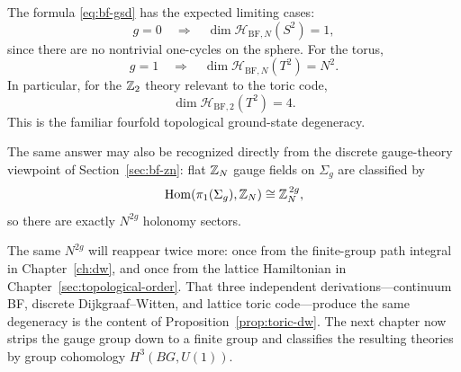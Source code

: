 \begin{remark}\label{rem:bf-gsd-checks}
The formula \eqref{eq:bf-gsd} has the expected limiting cases:
\begin{equation*}
g=0
\quad\Longrightarrow\quad
\dim \mathcal{H}_{\mathrm{BF},N}(S^2)=1,
\end{equation*}
since there are no nontrivial one-cycles on the sphere. For the torus,
\begin{equation*}
g=1
\quad\Longrightarrow\quad
\dim \mathcal{H}_{\mathrm{BF},N}(T^2)=N^2.
\end{equation*}
In particular, for the $\mathbb{Z}_2$ theory relevant to the toric code,
\begin{equation*}
\dim \mathcal{H}_{\mathrm{BF},2}(T^2)=4.
\end{equation*}
This is the familiar fourfold topological ground-state degeneracy.

\medskip

\noindent The same answer may also be recognized directly from the discrete gauge-theory viewpoint of Section~\ref{sec:bf-zn}: flat $\mathbb{Z}_N$ gauge fields on $\Sigma_g$ are classified by
\begin{equation*}
\operatorname{Hom}(\pi_1(\Sigma_g),\mathbb{Z}_N)\cong \mathbb{Z}_N^{\,2g},
\end{equation*}
so there are exactly $N^{2g}$ holonomy sectors.
\end{remark}

\medskip

\noindent The same $N^{2g}$ will reappear twice more: once from the finite-group path integral in Chapter~\ref{ch:dw}, and once from the lattice Hamiltonian in Chapter~\ref{sec:topological-order}.  That three independent derivations---continuum BF, discrete Dijkgraaf--Witten, and lattice toric code---produce the same degeneracy is the content of Proposition~\ref{prop:toric-dw}.  The next chapter now strips the gauge group down to a finite group and classifies the resulting theories by group cohomology $H^3(BG,U(1))$.
